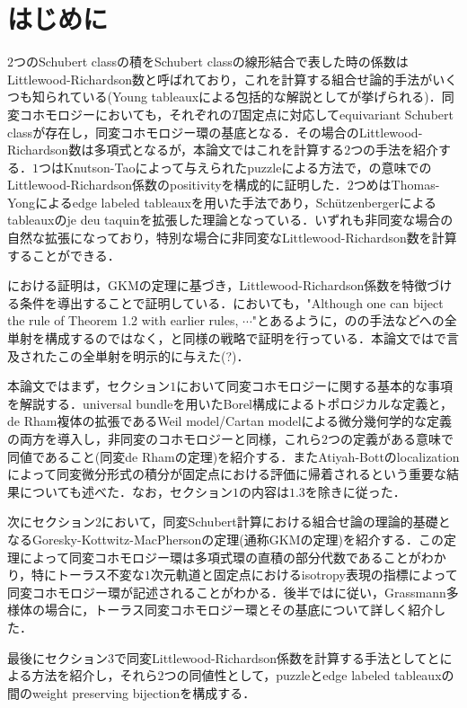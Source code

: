 \section*{はじめに}

$2$つのSchubert classの積をSchubert classの線形結合で表した時の係数はLittlewood-Richardson数と呼ばれており，これを計算する組合せ論的手法がいくつも知られている(Young tableauxによる包括的な解説として\cite{fulton young tableaux}が挙げられる)．同変コホモロジーにおいても，それぞれの$T$固定点に対応してequivariant Schubert classが存在し，同変コホモロジー環の基底となる．その場合のLittlewood-Richardson数は多項式となるが，本論文ではこれを計算する$2$つの手法を紹介する．$1$つはKnutson-Tao\cite{knutson tao}によって与えられたpuzzleによる方法で，\cite{positivity}の意味でのLittlewood-Richardson係数のpositivityを構成的に証明した．$2$つめはThomas-Yong\cite{thomas yong}によるedge labeled tableauxを用いた手法であり，Schützenbergerによるtableauxのje deu taquinを拡張した理論となっている．いずれも非同変な場合の自然な拡張になっており，特別な場合に非同変なLittlewood-Richardson数を計算することができる．

\cite{knutson tao}における証明は，GKMの定理に基づき，Littlewood-Richardson係数を特徴づける条件を導出することで証明している．\cite{thomas yong}においても，"Although one can biject the rule of Theorem 1.2
with earlier rules, $\cdots$"とあるように，\cite{knutson tao}のの手法などへの全単射を構成するのではなく，\cite{knutson tao}と同様の戦略で証明を行っている．本論文では\cite{thomas yong}で言及されたこの全単射を明示的に与えた(?)．

本論文ではまず，セクション$1$において同変コホモロジーに関する基本的な事項を解説する．universal bundleを用いたBorel構成によるトポロジカルな定義と，de Rham複体の拡張であるWeil model/Cartan modelによる微分幾何学的な定義の両方を導入し，非同変のコホモロジーと同様，これら$2$つの定義がある意味で同値であること(同変de Rhamの定理)を紹介する．またAtiyah-Bottのlocalizationによって同変微分形式の積分が固定点における評価に帰着されるという重要な結果についても述べた．なお，セクション$1$の内容は$1.3$を除き\cite{tu equivariant}に従った．

次にセクション$2$において，同変Schubert計算における組合せ論の理論的基礎となるGoresky-Kottwitz-MacPhersonの定理(通称GKMの定理)を紹介する．この定理によって同変コホモロジー環は多項式環の直積の部分代数であることがわかり，特にトーラス不変な$1$次元軌道と固定点におけるisotropy表現の指標によって同変コホモロジー環が記述されることがわかる．後半では\cite{knutson tao}に従い，Grassmann多様体の場合に，トーラス同変コホモロジー環とその基底について詳しく紹介した．

最後にセクション$3$で同変Littlewood-Richardson係数を計算する手法として\cite{knutson tao}と\cite{thomas yong}による方法を紹介し，それら$2$つの同値性として，puzzleとedge labeled tableauxの間のweight preserving bijectionを構成する．